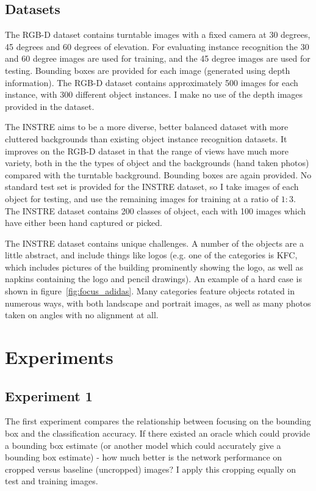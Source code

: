 \subsection{Datasets}

The RGB-D \cite{Lai2011} dataset contains turntable images with a fixed camera at 30 degrees, 45 degrees and 60 degrees of elevation. For evaluating instance recognition the 30 and 60 degree images are used for training, and the 45 degree images are used for testing. Bounding boxes are provided for each image (generated using depth information). The RGB-D dataset contains approximately 500 images for each instance, with 300 different object instances. I make no use of the depth images provided in the dataset.

The INSTRE \cite{Wang2015} aims to be a more diverse, better balanced dataset with more cluttered backgrounds than existing object instance recognition datasets. It improves on the RGB-D dataset in that the range of views have much more variety, both in the the types of object and the backgrounds (hand taken photos) compared with the turntable background. Bounding boxes are again provided. No standard test set is provided for the INSTRE dataset, so I take images of each object for testing, and use the remaining images for training at a ratio of $1:3$. The INSTRE dataset contains 200 classes of object, each with 100 images which have either been hand captured or picked. 

The INSTRE dataset contains unique challenges. A number of the objects are a little abstract, and include things like logos (e.g. one of the categories is KFC, which includes pictures of the building prominently showing the logo, as well as napkins containing the logo and pencil drawings). An example of a hard case is shown in figure~\ref{fig:focus_adidas}. Many categories feature objects rotated in numerous ways, with both landscape and portrait images, as well as many photos taken on angles with no alignment at all.

\section {Experiments}


\subsection {Experiment 1}

The first experiment compares the relationship between focusing on the bounding box and the classification accuracy. If there existed an oracle which could provide a bounding box estimate (or another model which could accurately give a bounding box estimate) - how much better is the network performance on cropped versus baseline (uncropped) images? I apply this cropping equally on test and training images.

